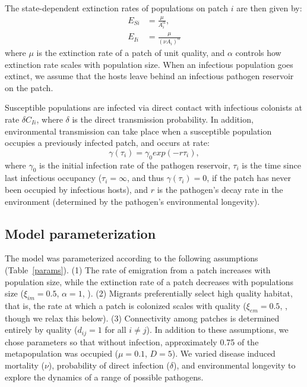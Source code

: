 \documentclass{article}
\begin{document}
The state-dependent extinction rates of populations on patch $i$ are then given by:
\begin{align}
E_{Si} & =\frac{\mu}{A_i^\alpha},\\
E_{Ii} & = \frac{\mu}{(\nu A_i) ^ \alpha}
\end{align}
where $\mu$ is the extinction rate of a patch of unit quality, and $\alpha$ controls how extinction rate scales with population size.  When an infectious population goes extinct, we assume that the hosts leave behind an infectious pathogen reservoir on the patch.  

Susceptible populations are infected via direct contact with infectious colonists at rate $\delta C_{Ii}$, where $\delta$ is the direct transmission probability.  In addition, environmental transmission can take place when a susceptible population occupies a previously infected patch, and occurs at rate:
\begin{equation}
\gamma(\tau_i)=\gamma_0exp(-r\tau_{i}),
\end{equation}
where $\gamma_0$ is the initial infection rate of the pathogen reservoir, $\tau_{i}$ is the time since last infectious occupancy ($\tau_{i} = \infty$, and thus $\gamma(\tau_i) = 0$, if the patch has never been occupied by infectious hosts), and $r$ is the pathogen's decay rate in the environment (determined by the pathogen's environmental longevity).

\subsection{Model parameterization}

The model was parameterized according to the following assumptions (Table~\ref{params}). 
(1) The rate of emigration from a patch increases with population size, while the extinction rate of a patch decreases with populations size ($\xi_{im}=0.5$, $\alpha=1$, \cite{Hanski2003}).  
(2) Migrants preferentially select high quality habitat, that is, the rate at which a patch is colonized scales with quality ($\xi_{em}=0.5$, \cite{Hanski2003}, though we relax this below).  
(3)  Connectivity among patches is determined entirely by quality ($d_{ij}=1$ for all $i \neq j$).  
In addition to these assumptions, we chose parameters so that without infection, approximately 0.75 of the metapopulation was occupied ($\mu = 0.1$, $D=5$).  We varied disease induced mortality ($\nu$), probability of direct infection ($\delta$), and environmental longevity to explore the dynamics of a range of possible pathogens.
\end{document}
